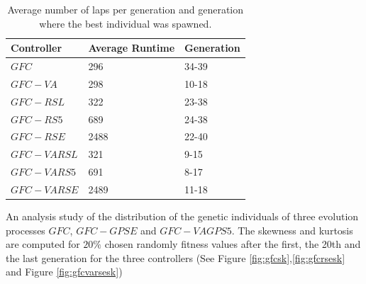 \documentclass[10pt,journal,compsoc]{IEEEtran}
\begin{document}
\begin{table}[!ht]
	\centering
	{\scriptsize
          \caption{Average number of laps per generation %
            and
                  generation where the best individual was spawned.}
		\label{tab:time}
		\begin{tabular}{|p{2.85cm}|p{1.65cm}|p{1.65cm}|}
			\hline 	
			\hline  
			Controller& \textbf{Average Runtime}&\textbf{Generation}\\					
			\hline \textbf{\textbf{$GFC$}}&296 &34-39\\
			\hline \textbf{$GFC-VA$}&298	&10-18\\	
			\hline \textbf{$GFC-RSL$}& 322&23-38\\	
			\hline \textbf{$GFC-RS5$}&689	&24-38\\	
			\hline \textbf{$GFC-RSE$}&	2488&22-40\\	
			\hline \textbf{$GFC-VARSL$}&321	&9-15\\	
			\hline\textbf{$GFC-VARS5$}&	691&8-17\\	
			\hline\textbf{$GFC-VARSE$}&2489	&11-18\\					
			\hline 
		\end{tabular}
		
	}
\end{table} 





An analysis study of the distribution  of the genetic individuals of three evolution processes $GFC$, $GFC-GPSE$ and $GFC-VAGPS5$.
The skewness and kurtosis are computed for $20\%$ chosen randomly fitness values after the first, the 20th and the last generation for the three controllers (See Figure \ref{fig:gfcsk},\ref{fig:gfcrsesk} and Figure \ref{fig:gfcvarsesk})
\end{document}
